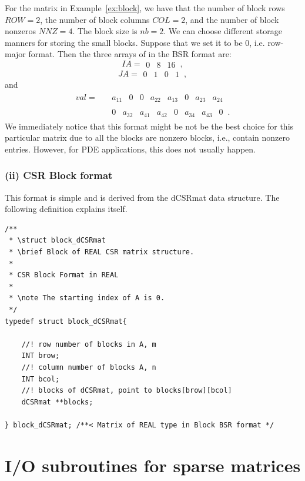 \documentclass[11pt]{memoir}
\begin{document}
For the matrix in Example~\ref{ex:block}, we have that the number of block rows $ROW=2$, the number of block columns $COL=2$, and the number of block nonzeros $NNZ = 4$. The block size is $nb = 2$. We can choose different storage manners for storing the small blocks. Suppose that we set it to be 0, i.e. row-major format. Then the three arrays of in the BSR format are:
$$
IA =
\begin{array}{||c||c||c||c||}0&8&16\end{array}\, ,
$$
$$
JA =
\begin{array}{||c|c||c|c||}
0&1&0&1\end{array}\, ,
$$
and
\begin{align*}
val = \;\; &
\begin{array}{||c|c|c|c||c|c|c|c||}
a_{11} & 0 & 0 & a_{22} & a_{13} & 0 & a_{23} & a_{24}
\end{array}\,
\\
& \begin{array}{||c|c|c|c||c|c|c|c||}
0 & a_{32} & a_{41} & a_{42} & 0 & a_{34} & a_{43} & 0
\end{array}\,.
\end{align*}
We immediately notice that this format might be not be the best choice for this particular matrix due to all the blocks are nonzero blocks, i.e., contain nonzero entries. However, for PDE applications, this does not usually happen. 

\subsubsection*{(ii) CSR Block format}
This format is simple and is derived from the dCSRmat data structure. The following definition explains itself. 
\begin{lstlisting}
/**
 * \struct block_dCSRmat
 * \brief Block of REAL CSR matrix structure.
 *
 * CSR Block Format in REAL
 *
 * \note The starting index of A is 0.
 */
typedef struct block_dCSRmat{
	
	//! row number of blocks in A, m
	INT brow;
	//! column number of blocks A, n
	INT bcol;
	//! blocks of dCSRmat, point to blocks[brow][bcol]
	dCSRmat **blocks;
	
} block_dCSRmat; /**< Matrix of REAL type in Block BSR format */
\end{lstlisting}
%


\section{I/O subroutines for sparse matrices}
\end{document}
